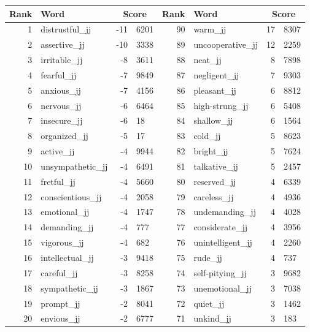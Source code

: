 \begin{table}[tbp]
    \begin{tabular}{| rlr@{.}l | rlr@{.}l |}
    \hline
    \textbf{Rank} & \textbf{Word} & \multicolumn{2}{c|}{\textbf{Score}} & \textbf{Rank} & \textbf{Word} & \multicolumn{2}{c|}{\textbf{Score}} \\
    \hline
    1 & distrustful\_jj & -11 & 6201    &    90 & warm\_jj & 17 & 8307 \\
    2 & assertive\_jj & -10 & 3338    &    89 & uncooperative\_jj & 12 & 2259 \\
    3 & irritable\_jj & -8 & 3611    &    88 & neat\_jj & 8 & 7898 \\
    4 & fearful\_jj & -7 & 9849    &    87 & negligent\_jj & 7 & 9303 \\
    5 & anxious\_jj & -7 & 4156    &    86 & pleasant\_jj & 6 & 8812 \\
    6 & nervous\_jj & -6 & 6464    &    85 & high-strung\_jj & 6 & 5408 \\
    7 & insecure\_jj & -6 & 18    &    84 & shallow\_jj & 6 & 1564 \\
    8 & organized\_jj & -5 & 17    &    83 & cold\_jj & 5 & 8623 \\
    9 & active\_jj & -4 & 9944    &    82 & bright\_jj & 5 & 7624 \\
    10 & unsympathetic\_jj & -4 & 6491    &    81 & talkative\_jj & 5 & 2457 \\
    11 & fretful\_jj & -4 & 5660    &    80 & reserved\_jj & 4 & 6339 \\
    12 & conscientious\_jj & -4 & 2058    &    79 & careless\_jj & 4 & 4936 \\
    13 & emotional\_jj & -4 & 1747    &    78 & undemanding\_jj & 4 & 4028 \\
    14 & demanding\_jj & -4 & 777    &    77 & considerate\_jj & 4 & 3956 \\
    15 & vigorous\_jj & -4 & 682    &    76 & unintelligent\_jj & 4 & 2260 \\
    16 & intellectual\_jj & -3 & 9418    &    75 & rude\_jj & 4 & 737 \\
    17 & careful\_jj & -3 & 8258    &    74 & self-pitying\_jj & 3 & 9682 \\
    18 & sympathetic\_jj & -3 & 1867    &    73 & unemotional\_jj & 3 & 7038 \\
    19 & prompt\_jj & -2 & 8041    &    72 & quiet\_jj & 3 & 1462 \\
    20 & envious\_jj & -2 & 6777    &    71 & unkind\_jj & 3 & 183 \\

\end{tabular}
\end{table}
